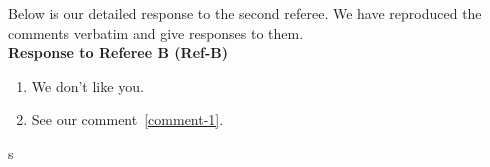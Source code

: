 Below is our detailed response to the second referee. We have reproduced the comments verbatim and give responses to them.\\

\bigskip
\noindent\textbf{Response to Referee B (Ref-B)}
%

\begin{enumerate}[start=1,label={\color{black}(\bfseries Ref-B \arabic*):}]
	\item {}\label{comment-1}
	
	We don't like you.
	
	\item {}
	
	See our comment~\ref{comment-1}.
\end{enumerate}
s